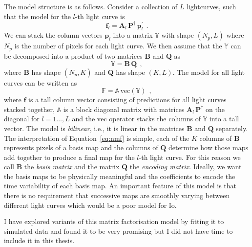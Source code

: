 \documentclass[12pt,dvipsnames]{report}
\newcommand{\hquad}{~~}
\begin{document}
The model structure is as follows. Consider a collection of $L$ lightcurves, 
such that the model for the $l$-th light curve is
\begin{equation}
    \mathbf{f}_l=\mathbf{A}_l\,\mathbf{P}^\dagger\,\mathbf{p}_l^\prime
    \hquad.
\end{equation}
We can stack the column vectors $\mathbf{p}_l$ into a matrix $\mathbb{Y}$ with shape 
$(N_p, L)$ where $N_p$ is the number of pixels for each light curve.
We then assume that the $\mathbb{Y}$ can be decomposed into a product of two matrices 
$\mathbf{B}$ and $\mathbf{Q}$ as
\begin{equation}
    \mathbb{Y}=\mathbf{B}\,\mathbf{Q}
    \hquad,
    \label{eq:nmf}
\end{equation}
where $\mathbf{B}$ has shape $(N_p, K)$ and $\mathbf{Q}$ has shape $(K, L)$.
The model for all light curves can be written as
\begin{equation}
    \mathbb{F}=\mathbb{A}\,\mathrm{vec}(\mathbf{\mathbb{Y}})
    \hquad,
    \label{eq:model_all_lcs}
\end{equation}
where $\mathbf{f}$ is a tall column vector consisting of predictions for all light 
curves stacked together, $\mathbb{A}$ is a block diagonal matrix with matrices 
$\mathbf{A}_l\,\mathbf{P}^\dagger$ on the diagonal for $l=1\dots, L$ and the 
$\mathrm{vec}$ operator stacks the columns of $\mathbb{Y}$ into a tall vector.
The model is \emph{bilinear}, i.e., it is linear in the matrices $\mathbf{B}$ 
and $\mathbf{Q}$ separately.
The interpretation of Equation~\ref{eq:nmf} is simple, each of the $K$ columns of 
$\mathbf{B}$ represents pixels of a basis map and the columns of $\mathbf{Q}$ 
determine how those maps add together to produce a final map for the $l$-th light curve.
For this reason we call $\mathbf{B}$ the \emph{basis matrix} and the matrix 
$\mathbf{Q}$ the \emph{encoding matrix}.
Ideally, we want the basis maps to be physically meaningful and the coefficients 
to encode the time variability of each basis map.
An important feature of this model is that there is no requirement that successive maps 
are smoothly varying between different light curves which would be a poor model for Io.

I have explored variants of this matrix factorisation model by fitting it to simulated 
data and found it to be very promising but I did not have time to include it in this 
thesis.

\end{document}
